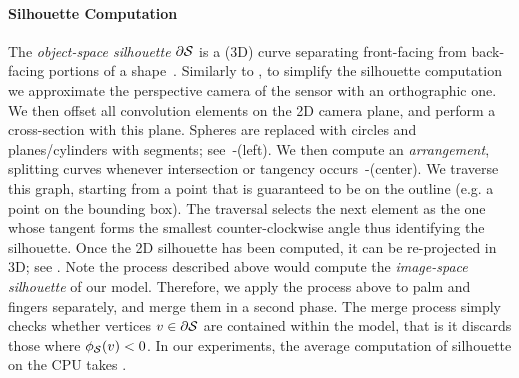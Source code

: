 \paragraph{Silhouette Computation}
The \emph{object-space silhouette} $\partial \mathcal{S}$ is a (3D) curve separating front-facing from back-facing portions of a shape~\cite[Sec.1]{olson2006eg}. Similarly to \cite{tagliasacchi2015robust}, to simplify the silhouette computation we approximate the perspective camera of the sensor with an orthographic one. We then offset all convolution elements on the 2D camera plane, and perform a cross-section with this plane. Spheres are replaced with circles and planes/cylinders with segments; see~-(left). We then compute an \emph{arrangement}, splitting curves whenever intersection or tangency occurs~-(center). We traverse this graph, starting from a point that is guaranteed to be on the outline (e.g. a point on the bounding box). The traversal selects the next element as the one whose tangent forms the smallest counter-clockwise angle thus identifying the silhouette. Once the 2D silhouette has been computed, it can be re-projected in 3D; see . Note the process described above would compute the \emph{image-space silhouette} of our model. Therefore, we apply the process above to palm and fingers separately, and merge them in a second phase. The merge process simply checks whether vertices $v \in \partial \mathcal{S}$ are contained within the model, that is it discards those where $\phi_{\mathcal{S}}(v)<0$. In our experiments, the average computation of silhouette on the CPU takes .
 
